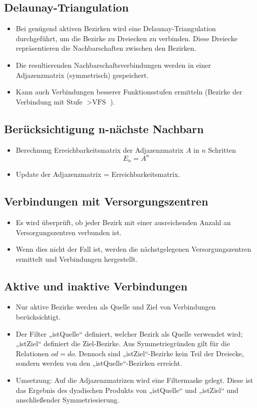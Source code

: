 \subsection*{Delaunay-Triangulation}
\begin{itemize}
\item 
Bei genügend aktiven Bezirken wird eine Delaunay-Triangulation durchgeführt, um die Bezirke zu Dreiecken zu verbinden. Diese Dreiecke repräsentieren die Nachbarschaften zwischen den Bezirken. 
\item 
Die resultierenden Nachbarschaftsverbindungen werden in einer Adjazenzmatrix (symmetrisch) gespeichert.
\item 
Kann auch Verbindungen besserer Funktionsstufen ermitteln (Bezirke der Verbindung mit Stufe $>\textrm{VFS}$ ).
\end{itemize}

\subsection*{Berücksichtigung n-nächste Nachbarn}
\begin{itemize}
\item Berechnung Erreichbarkeitsmatrix der Adjazenzmatrix $A$ in $n$ Schritten 
\[
E_n = A^n
\]
\item Update der Adjazenzmatrix = Erreichbarkeitsmatrix.
\end{itemize}


\subsection*{Verbindungen mit Versorgungszentren}
\begin{itemize}
\item
Es wird überprüft, ob jeder Bezirk mit einer ausreichenden Anzahl an Versorgungszentren verbunden ist.
\item
 Wenn dies nicht der Fall ist, werden die nächstgelegenen Versorgungszentren ermittelt und Verbindungen hergestellt.
\end{itemize}

\subsection*{Aktive und inaktive Verbindungen}

\begin{itemize}
\item
Nur aktive Bezirke werden als Quelle und Ziel von Verbindungen berücksichtigt. 
\item
Der Filter „istQuelle“ definiert, welcher Bezirk als Quelle verwendet wird; „istZiel“ definiert die Ziel-Bezirke. Aus Symmetriegründen gilt für die Relationen $od = do$. Dennoch sind „istZiel“-Bezirke kein Teil der Dreiecke, sondern werden von den „istQuelle“-Bezirken erreicht.
\item
Umsetzung: Auf die Adjazenzmatrizen wird eine Filtermaske gelegt. Diese ist das Ergebnis des dyadischen Produkts von „istQuelle“ und „istZiel“ und anschließender Symmetriesierung.

\end{itemize}


